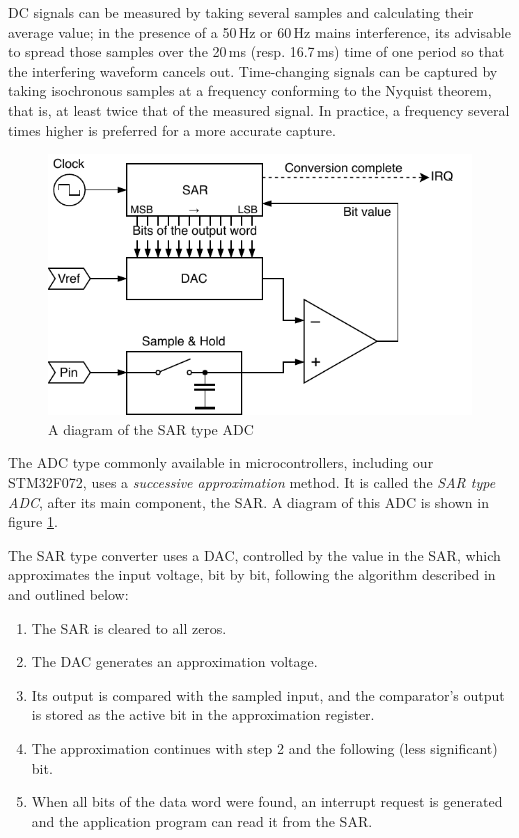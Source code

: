 \gls{DC} signals can be measured by taking several samples and calculating their average value; in the presence of a 50\,Hz or 60\,Hz mains interference, its advisable to spread those samples over the 20\,ms (resp. 16.7\,ms) time of one period so that the interfering waveform cancels out. Time-changing signals can be captured by taking isochronous samples at a frequency conforming to the Nyquist theorem, that is, at least twice that of the measured signal. In practice, a frequency several times higher is preferred for a more accurate capture.

\begin{figure}
	\centering
	\includegraphics[scale=1] {img/sar-adc.pdf}
	\caption{\label{fig:adc-sar}A diagram of the SAR type ADC}
\end{figure}

The \gls{ADC} type commonly available in microcontrollers, including our STM32F072, uses a \textit{successive approximation} method. It is called the \textit{SAR type \gls{ADC}}, after its main component, the \gls{SAR}. A diagram of this \gls{ADC} is shown in figure \ref{fig:adc-sar}.

The \gls{SAR} type converter uses a \gls{DAC}, controlled by the value in the \gls{SAR}, which approximates the input voltage, bit by bit, following the algorithm described in \cite{adc-sar} and outlined below:

\begin{enumerate}
	\item The \gls{SAR} is cleared to all zeros.
	\item The \gls{DAC} generates an approximation voltage.
	\item Its output is compared with the sampled input, and the comparator's output is stored as the active bit in the approximation register.
	\item The approximation continues with step 2 and the following (less significant) bit.
	\item When all bits of the data word were found, an interrupt request is generated and the application program can read it from the \gls{SAR}.
\end{enumerate}

